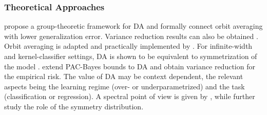 \documentclass[mathematics,review,submit,moreauthors]{Definitions/mdpi}
\begin{document}
\subsubsection{Theoretical Approaches}
\citet{chen2020} propose a group-theoretic framework for DA and formally connect orbit averaging with lower generalization error.
Variance reduction results can also be obtained \citep{chen2020,dao2019p3icml}.
Orbit averaging is adapted and practically implemented by \citet{benton2020anips}.
For infinite-width and kernel-classifier settings, DA is shown to be equivalent to symmetrization of the model \citep{maass2024,dao2019p3icml}.
\citet{lyle2020} extend PAC-Bayes bounds to DA and obtain variance reduction for the empirical risk.
The value of DA may be context dependent, the relevant aspects being the learning regime (over- or underparametrized) and the task (classification or regression).
A spectral point of view is given by \citet{lin2024}, while \citet{lawrence2026} further study the role of the symmetry distribution.
\end{document}

